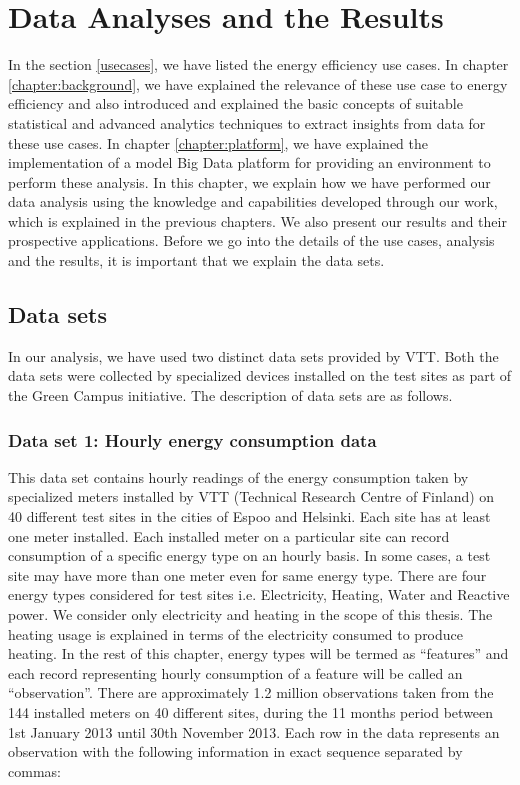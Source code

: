 \chapter{Data Analyses and the Results}
\label{chapter:Analysis}

In the section \ref{usecases}, we have listed the energy efficiency use cases. In chapter \ref{chapter:background}, we have explained the relevance of these use case to energy efficiency and also introduced and explained the basic concepts of suitable statistical and advanced analytics techniques to extract insights from data for these use cases. In chapter \ref{chapter:platform}, we have explained the implementation of a model Big Data platform for providing an environment to perform these analysis. In this chapter, we explain how we have performed our data analysis using the knowledge and capabilities developed through our work, which is explained in the previous chapters. We also present our results and their prospective applications. Before we go into the details of the use cases, analysis and the results, it is important that we explain the data sets.

\section{Data sets} \label{datasets}
In our analysis, we have used two distinct data sets provided by VTT. Both the data sets were collected by specialized devices installed on the test sites as part of the Green Campus initiative. The description of data sets are as follows.

\subsection{Data set 1: Hourly energy consumption data}
This data set contains hourly readings of the energy consumption taken by specialized meters installed by VTT (Technical Research Centre of Finland) on 40 different test sites in the cities of Espoo and Helsinki. Each site has at least one meter installed. Each installed meter on a particular site can record consumption of a specific energy type on an hourly basis. In some cases, a test site may have more than one meter even for same energy type. There are four energy types considered for test sites i.e. Electricity, Heating, Water and Reactive power. We consider only electricity and heating in the scope of this thesis. The heating usage is explained in terms of the electricity consumed to produce heating.  In the rest of this chapter, energy types will be termed as ``features'' and each record representing hourly consumption of a feature will be called an ``observation''.
There are approximately 1.2 million observations taken from the 144 installed meters on 40 different sites, during the 11 months period between 1st January 2013 until 30th November 2013.  Each row in the data represents an observation with the following information in exact sequence separated by commas: 

